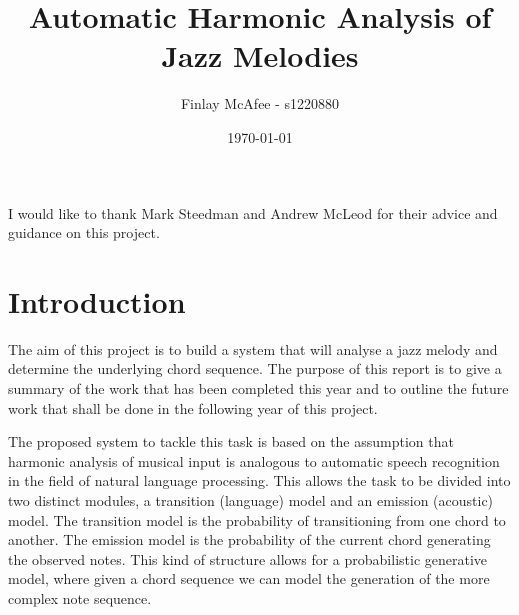 \documentclass[bsc,singlespacing,parskip,deptreport,twoside,frontabs]{infthesis}
\begin{document}
\title{Automatic Harmonic Analysis of Jazz Melodies}

\author{Finlay McAfee - s1220880}


\date{\today
}


\maketitle

\begin{acknowledgements}
I would like to thank Mark Steedman and Andrew McLeod for their advice and guidance on this project.
\end{acknowledgements}

\tableofcontents


\chapter{Introduction}

The aim of this project is to build a system that will analyse a jazz melody and determine the underlying chord sequence. The purpose of this report is to give a summary of the work that has been completed this year and to outline the future work that shall be done in the following year of this project.

The proposed system to tackle this task is based on the assumption that harmonic analysis of musical input is analogous to automatic speech recognition in the field of natural language processing. This allows the task to be divided into two distinct modules, a transition (language) model and an emission (acoustic) model. The transition model is the probability of transitioning from one chord to another. The emission model is the probability of the current chord generating the observed notes. This kind of structure allows for a probabilistic generative model, where given a chord sequence we can model the generation of the more complex note sequence.
\end{document}
